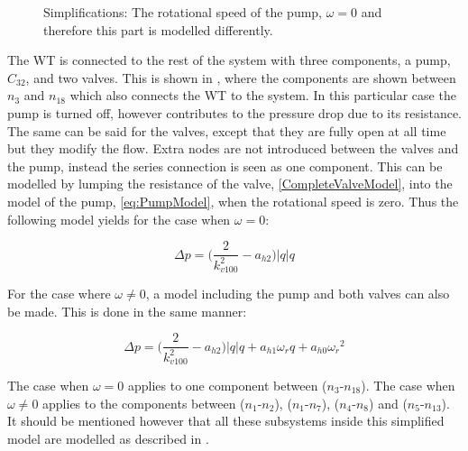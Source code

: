 \begin{figure}[H]
	\centering
	 
	\caption{Simplifications: The rotational speed of the pump, $\omega = 0$ and therefore this part is modelled differently.}
	  \label{fig:subsys_1}
\end{figure}

The WT is connected to the rest of the system with three components, a pump, $C_{32}$, and two valves. This is shown in , where the components are shown between $n_3$ and $n_{18}$ which also connects the WT to the system. In this particular case the pump is turned off, however contributes to the pressure drop due to its resistance. The same can be said for the valves, except that they are fully open at all time but they modify the flow. Extra nodes are not introduced between the valves and the pump, instead the series connection is seen as one component. This can be modelled by lumping the resistance of the valve, \eqref{CompleteValveModel}, into the model of the pump, \eqref{eq:PumpModel}, when the rotational speed is zero. Thus the following model yields for the case when $\omega = 0$:

\begin{equation}
  \Delta p = \Big(\frac{2}{k_{v100}^2} - a_{h2}\Big)|q| q 
  \label{omega_zero}
\end{equation}

For the case where $\omega \neq 0$, a model including the pump and both valves can also be made. This is done in the same manner: 

\begin{equation}
  \Delta p = \Big(\frac{2}{k_{v100}^2} - a_{h2}\Big)|q| q  + a_{h1} \omega_r q + a_{h0}{\omega_r}^2
  \label{omega_notzero}
\end{equation}

The case when $\omega = 0$ applies to one component between ($n_3$-$n_{18}$). The case when $\omega \neq 0$ applies to the components between ($n_1$-$n_2$), ($n_1$-$n_7$), ($n_4$-$n_8$) and ($n_5$-$n_{13}$). It should be mentioned however that all these subsystems inside this simplified model are modelled as described in . 
\\

